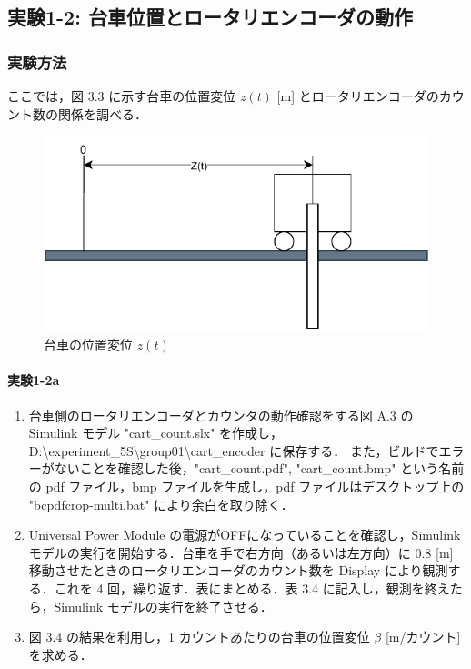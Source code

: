 \subsection{実験1-2: 台車位置とロータリエンコーダの動作}

\subsubsection{実験方法}
ここでは，図 3.3 に示す台車の位置変位 \( z(t) \) [m] とロータリエンコーダのカウント数の関係を調べる．

\begin{figure}[h]
  \centering
  \includegraphics[scale=1]{sozai/daisyanoichihenni.pdf}
  \caption{台車の位置変位 \( z(t) \)}
\end{figure}


\paragraph{実験1-2a}
\begin{enumerate}
  \item 台車側のロータリエンコーダとカウンタの動作確認をする図 A.3 の Simulink モデル
        "cart\_count.slx" を作成し，D:\textbackslash experiment\_5S\textbackslash group01\textbackslash cart\_encoder に保存する．
        また，ビルドでエラーがないことを確認した後，"cart\_count.pdf", "cart\_count.bmp" 
        という名前の pdf ファイル，bmp ファイルを生成し，pdf ファイルはデスクトップ上の 
        "bcpdfcrop-multi.bat" により余白を取り除く．
        
  \item Universal Power Module の電源がOFFになっていることを確認し，Simulink モデルの実行を開始する．台車を手で右方向（あるいは左方向）に 0.8 [m] 移動させたときのロータリエンコーダのカウント数を Display により観測する．これを 4 回，繰り返す．表にまとめる．表 3.4 に記入し，観測を終えたら，Simulink モデルの実行を終了させる．
        
  \item 図 3.4 の結果を利用し，1 カウントあたりの台車の位置変位 \( \beta \) [m/カウント] を求める．
\end{enumerate}

